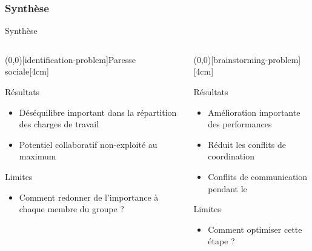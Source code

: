 \documentclass[english,french,dvips,10pt]{mybeamer}
\begin{document}
	\subsubsection{Synthèse}
	\begin{myframe}{Synthèse}
		\begin{columns}[t]
			\begin{column}{0.475\textwidth}
				\centering
				\myunode[90][shadowcolor=myblue](0,0)[identification-problem]{Paresse sociale}[4cm]
				\begin{myplusblock}{Résultats }
					\begin{itemize}
						\item Déséquilibre important dans la répartition des charges de travail
						\item Potentiel collaboratif non-exploité au maximum
					\end{itemize}
				\end{myplusblock}
				\begin{myminusblock}{Limites}
					\begin{itemize}
						\item Comment redonner de l'importance à chaque membre du groupe ?
					\end{itemize}
				\end{myminusblock}
			\end{column}
			\begin{column}{0.475\textwidth}
				\centering
				\myunode[90][shadowcolor=myblue](0,0)[brainstorming-problem]{\myBrainstorming}[4cm]
				\begin{myplusblock}{Résultats }
					\begin{itemize}
						\item Amélioration importante des performances
						\item Réduit les conflits de coordination
						\item Conflits de communication pendant le \mybrainstorming
					\end{itemize}
				\end{myplusblock}
				\begin{myminusblock}{Limites}
					\begin{itemize}
						\item Comment optimiser cette étape ?
					\end{itemize}
				\end{myminusblock}
			\end{column}
		\end{columns}
	\end{myframe}
\end{document}
